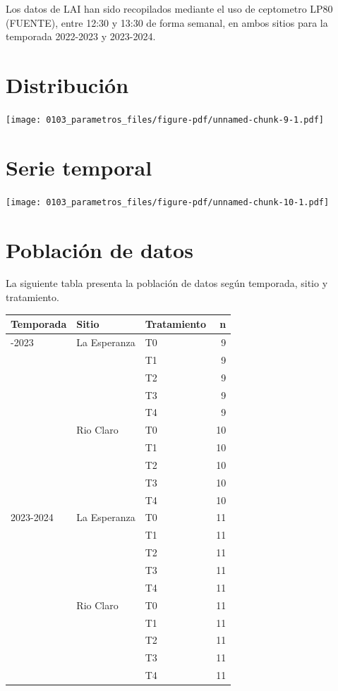 \documentclass[
  letterpaper,
  DIV=11,
  numbers=noendperiod]{scrreprt}
\begin{document}
Los datos de LAI han sido recopilados mediante el uso de ceptometro LP80
(FUENTE), entre 12:30 y 13:30 de forma semanal, en ambos sitios para la
temporada 2022-2023 y 2023-2024.

\chapter{Distribución}

\begin{center}
\texttt{[image: 0103\_parametros\_files/figure-pdf/unnamed-chunk-9-1.pdf]}
\end{center}

\chapter{Serie temporal}

\begin{center}
\texttt{[image: 0103\_parametros\_files/figure-pdf/unnamed-chunk-10-1.pdf]}
\end{center}

\chapter{Población de datos}

La siguiente tabla presenta la población de datos según temporada, sitio
y tratamiento.

\begin{longtable}[]{@{}lllr@{}}
\toprule\noalign{}
Temporada & Sitio & Tratamiento & n \\
\midrule\noalign{}
\endhead
\bottomrule\noalign{}
\endlastfoot
2022-2023 & La Esperanza & T0 & 9 \\
& & T1 & 9 \\
& & T2 & 9 \\
& & T3 & 9 \\
& & T4 & 9 \\
& Rio Claro & T0 & 10 \\
& & T1 & 10 \\
& & T2 & 10 \\
& & T3 & 10 \\
& & T4 & 10 \\
2023-2024 & La Esperanza & T0 & 11 \\
& & T1 & 11 \\
& & T2 & 11 \\
& & T3 & 11 \\
& & T4 & 11 \\
& Rio Claro & T0 & 11 \\
& & T1 & 11 \\
& & T2 & 11 \\
& & T3 & 11 \\
& & T4 & 11 \\
\end{longtable}
\end{document}
